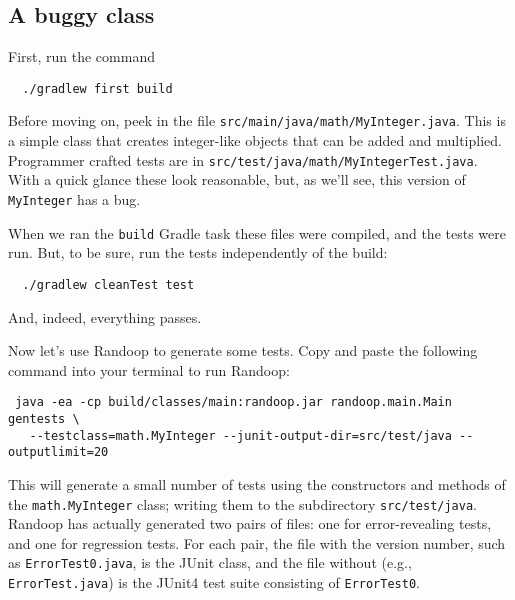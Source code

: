 \documentclass[11pt, oneside]{article} %
\newcommand{\code}[1]{{\texttt{#1}}}
\newcommand{\cmd}[1]{{\texttt{#1}}}
\begin{document}
\subsection{A buggy class}
First, run the command
\begin{verbatim}
  ./gradlew first build
\end{verbatim}

Before moving on, peek in the file \texttt{src/main/java/math/MyInteger.java}.
This is a simple class that creates integer-like objects that can be added and multiplied.
Programmer crafted tests are in \texttt{src/test/java/math/MyIntegerTest.java}.
With a quick glance these look reasonable, but, as we'll see, this version of \code{MyInteger} has a bug.

When we ran the \cmd{build} Gradle task these files were compiled, and the tests were run.
But, to be sure, run the tests independently of the build:
\begin{verbatim}
  ./gradlew cleanTest test
\end{verbatim}
And, indeed, everything passes.

Now let's use Randoop to generate some tests.
Copy and paste the following command into your terminal to run Randoop:
\begin{verbatim}
 java -ea -cp build/classes/main:randoop.jar randoop.main.Main gentests \
   --testclass=math.MyInteger --junit-output-dir=src/test/java --outputlimit=20
\end{verbatim}
This will generate a small number of tests using the constructors and methods of the \texttt{math.MyInteger} class; writing them to the subdirectory \texttt{src/test/java}.
Randoop has actually generated two pairs of files: one for error-revealing tests, and one for regression tests.
For each pair, the file with the version number, such as \texttt{ErrorTest0.java}, is the JUnit class, and the file without (e.g., \texttt{ErrorTest.java}) is the JUnit4 test suite consisting of \code{ErrorTest0}.
\end{document}

